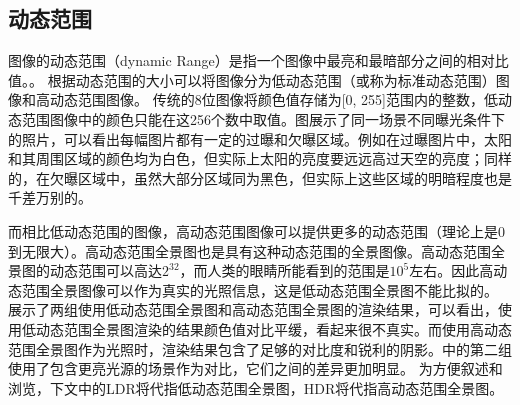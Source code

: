 \subsection{动态范围}
图像的动态范围（dynamic Range）是指一个图像中最亮和最暗部分之间的相对比值。\cite{wikipedia}。
根据动态范围的大小可以将图像分为低动态范围（或称为标准动态范围）图像和高动态范围图像。
传统的8位图像将颜色值存储为[0, 255]范围内的整数，低动态范围图像中的颜色只能在这256个数中取值。图展示了同一场景不同曝光条件下的照片，可以看出每幅图片都有一定的过曝和欠曝区域。例如在过曝图片中，太阳和其周围区域的颜色均为白色，但实际上太阳的亮度要远远高过天空的亮度；同样的，在欠曝区域中，虽然大部分区域同为黑色，但实际上这些区域的明暗程度也是千差万别的。

而相比低动态范围的图像，高动态范围图像可以提供更多的动态范围（理论上是0到无限大）。高动态范围全景图也是具有这种动态范围的全景图像。高动态范围全景图的动态范围可以高达$2^{32}$，而人类的眼睛所能看到的范围是$10^5$左右\cite{wikipedia}。因此高动态范围全景图像可以作为真实的光照信息，这是低动态范围全景图不能比拟的。
展示了两组使用低动态范围全景图和高动态范围全景图的渲染结果，可以看出，使用低动态范围全景图渲染的结果颜色值对比平缓，看起来很不真实。而使用高动态范围全景图作为光照时，渲染结果包含了足够的对比度和锐利的阴影。中的第二组使用了包含更亮光源的场景作为对比，它们之间的差异更加明显。
为方便叙述和浏览，下文中的LDR将代指低动态范围全景图，HDR将代指高动态范围全景图。
